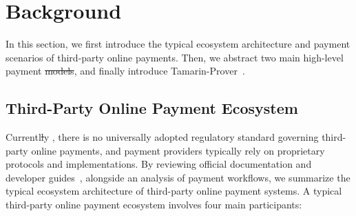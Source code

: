 \documentclass[journal]{IEEEtran}
\makeatletter
\newcommand{\Tamarin}{Tamarin-Prover\xspace}
\providecommand{\DIFaddtex}[1]{{\protect\color{blue}\uwave{#1}}} %
\providecommand{\DIFdeltex}[1]{{\protect\color{red}\sout{#1}}} %
\providecommand{\DIFaddbegin}{} %
\providecommand{\DIFaddend}{} %
\providecommand{\DIFdelbegin}{} %
\providecommand{\DIFdelend}{} %
\providecommand{\DIFadd}[1]{\texorpdfstring{\DIFaddtex{#1}}{#1}} %
\providecommand{\DIFdel}[1]{\texorpdfstring{\DIFdeltex{#1}}{}} %
\providecommand{\DIFscaledelfig}{0.5}
\newlength{\DIFdelgraphicswidth} %
\newlength{\DIFdelgraphicsheight} %
\providecommand{\DIFaddincludegraphics}[2][]{{\color{blue}\fbox{\DIFOincludegraphics[#1]{#2}}}} %
\providecommand{\DIFdelincludegraphics}[2][]{%
\sbox{\DIFdelgraphicsbox}{\DIFOincludegraphics[#1]{#2}}%
\settoboxwidth{\DIFdelgraphicswidth}{\DIFdelgraphicsbox} %
\settoboxtotalheight{\DIFdelgraphicsheight}{\DIFdelgraphicsbox} %
\scalebox{\DIFscaledelfig}{%
\parbox[b]{\DIFdelgraphicswidth}{\usebox{\DIFdelgraphicsbox}\\[-\baselineskip] \rule{\DIFdelgraphicswidth}{0em}}\llap{\resizebox{\DIFdelgraphicswidth}{\DIFdelgraphicsheight}{%
\setlength{\unitlength}{\DIFdelgraphicswidth}%
\begin{picture}(1,1)%
\thicklines\linethickness{2pt} %
{\color[rgb]{1,0,0}\put(0,0){\framebox(1,1){}}}%
{\color[rgb]{1,0,0}\put(0,0){\line( 1,1){1}}}%
{\color[rgb]{1,0,0}\put(0,1){\line(1,-1){1}}}%
\end{picture}%
}\hspace*{3pt}}} %
} %
\DeclareRobustCommand{\DIFaddbegin}{\DIFOaddbegin \let\includegraphics\DIFaddincludegraphics} %
\DeclareRobustCommand{\DIFaddend}{\DIFOaddend \let\includegraphics\DIFOincludegraphics} %
\DeclareRobustCommand{\DIFdelbegin}{\DIFOdelbegin \let\includegraphics\DIFdelincludegraphics} %
\DeclareRobustCommand{\DIFdelend}{\DIFOaddend \let\includegraphics\DIFOincludegraphics} %
\let\sout@orig\sout %
\renewcommand{\sout}[1]{\ifmmode\text{\sout@orig{\ensuremath{#1}}}\else\sout@orig{#1}\fi} %
\makeatother
\begin{document}
\DIFaddend %

\section{Background}

In this section, we first introduce the typical ecosystem architecture and payment scenarios of third-party online payments. 
Then, we abstract two main high-level payment \DIFdelbegin \DIFdel{models}\DIFdelend \DIFaddbegin \DIFadd{patterns}\DIFaddend , and finally introduce \Tamarin~\cite{Meier2013TAMARINProver}.

\subsection{Third-Party Online Payment Ecosystem} \label{sec:payment-ecosystem}

Currentl\DIFdelbegin \DIFdel{l}\DIFdelend y , there is no universally adopted regulatory standard governing third-party online payments, 
and payment providers typically rely on proprietary protocols and implementations.
By reviewing official documentation and developer guides~\cite{Alipay2025OpenPlatform}, alongside an analysis of payment workflows,
we summarize the typical ecosystem architecture of third-party online payment systems.
A typical third-party online payment ecosystem involves four main participants:
\end{document}
